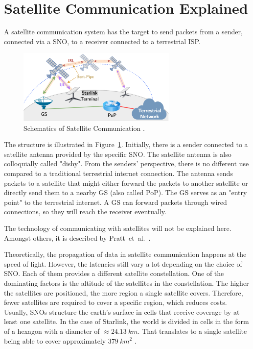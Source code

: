 \section{Satellite Communication Explained} \label{sec:satellite-communication-explained}

A satellite communication system has the target to send packets from a sender,
connected via a \ac{SNO}, to a receiver connected to a terrestrial ISP.

\begin{figure}[!ht]
	\centering
	\includegraphics[width=0.7\textwidth]{./chapters/2-background/img/satcom-structure-mohan.png}
	\caption{Schematics of Satellite Communication \cite{DBLP:conf/www/MohanFCBRMO24}.}
	\label{fig:sat-com-explained}
\end{figure}

The structure is illustrated in Figure~\ref{fig:sat-com-explained}.
Initially, there is a sender connected to a satellite antenna provided by the
specific \ac{SNO}. The satellite antenna is also colloquially called "dishy".
From the senders' perspective, there is no different use compared to a
traditional terrestrial internet connection. The antenna sends packets to a
satellite that might either forward the packets to another satellite or
directly send them to a nearby \ac{GS} (also called \ac{PoP}). The \ac{GS}
serves as an "entry point" to the terrestrial internet. A \ac{GS} can forward
packets through wired connections, so they will reach the receiver eventually.

The technology of communicating with satellites will not be explained here.
Amongst others, it is described by Pratt~et~al.~\cite{pratt2019satellite}.

Theoretically, the propagation of data in satellite communication happens at
the speed of light. However, the latencies still vary a lot depending on the
choice of \ac{SNO}. Each of them provides a different satellite constellation.
One of the dominating factors is the altitude of the satellites in the
constellation. The higher the satellites are positioned, the more region a
single satellite covers. Therefore, fewer satellites are required to cover a
specific region, which reduces costs. Usually, \ac{SNO}s structure the earth's
surface in cells that receive coverage by at least one satellite. In the case
of Starlink, the world is divided in cells in the form of a hexagon with a
diameter of $\approx 24.13~km$. That translates to a single satellite being
able to cover approximately $379~km^2$ \cite{Pekhterev2021}.

